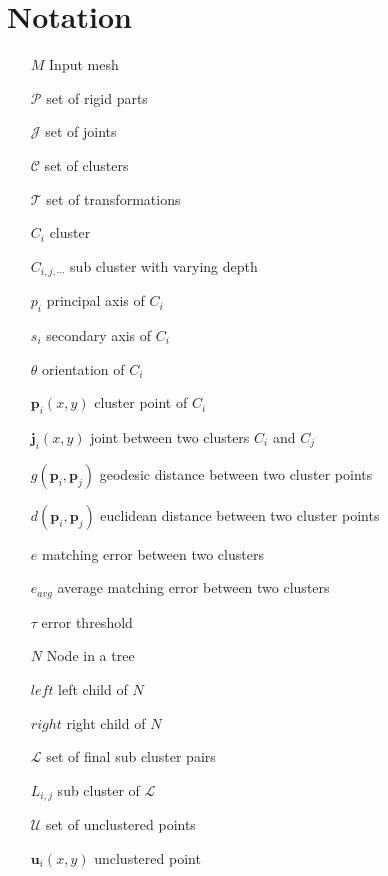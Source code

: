 \chapter{Notation}
\label{cha:Notation}

\begin{itemize}
	\item[$M$] Input mesh
	\item[$\mathcal{P}$] set of rigid parts
	\item[$\mathcal{J}$] set of joints
	\item[$\mathcal{C}$] set of clusters
	\item[$\mathcal{T}$] set of transformations
	\item[$C_i$] cluster
	\item[$C_{i,j,\cdots}$] sub cluster with varying depth
	\item[$p_i$] principal axis of $C_i$
	\item[$s_i$] secondary axis of $C_i$
	\item[$\theta$] orientation of $C_i$
	\item[$\boldsymbol{p}_i(x,y)$] cluster point of $C_i$
	\item[$\boldsymbol{j}_i(x,y)$] joint between two clusters $C_i$ and $C_j$
	\item[$g(\boldsymbol{p}_i,\boldsymbol{p}_j)$] geodesic distance between two cluster points
	\item[$d(\boldsymbol{p}_i,\boldsymbol{p}_j)$] euclidean distance between two cluster points
	\item[$e$] matching error between two clusters
	\item[$e_{avg}$] average matching error between two clusters 
	\item[$\tau$] error threshold 
	\item[$N$] Node in a tree
	\item[$\mathit{left}$] left child of $N$
	\item[$\mathit{right}$] right child of $N$
	\item[$\mathcal{L}$] set of final sub cluster pairs
	\item[$L_{i,j}$] sub cluster of $\mathcal{L}$	
	\item[$\mathcal{U}$] set of unclustered points
	\item[$\boldsymbol{u}_i(x,y)$] unclustered point
\end{itemize}


